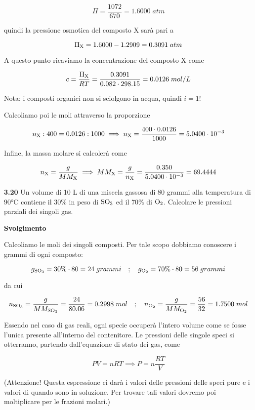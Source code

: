 $$\Pi=\frac{1072}{670}=1.6000\;atm$$

quindi la pressione osmotica del composto X sarà pari a

$$\Pi_{\rm X}=1.6000 - 1.2909 = 0.3091\;atm$$

A questo punto ricaviamo la concentrazione del composto X come

$$c=\frac{\Pi_{\rm X}}{RT}=\frac{0.3091}{0.082 \cdot 298.15}
=0.0126\;mol/L$$

Nota: i composti organici non si sciolgono in acqua, quindi $i=1$!

Calcoliamo poi le moli attraverso la proporzione

$$n_{\rm X}:400=0.0126:1000
\implies
n_{\rm X}=\frac{400 \cdot 0.0126}{1000}
=5.0400 \cdot 10^{-3}$$

Infine, la massa molare si calcolerà come

$$n_{\rm X}=\frac{g}{MM_{\rm X}}
\implies
MM_{\rm X}=\frac{g}{n_{\rm X}}=\frac{0.350}{5.0400 \cdot 10^{-3}}=69.4444$$

\vspace{0.2cm}\textbf{3.20} Un volume di 10 L di una miscela gassosa di 80 grammi alla temperatura di 90°C contiene il
30\% in peso di $\rm SO_3$ ed il 70\% di $\rm O_2$. Calcolare le pressioni parziali dei singoli gas.

\vspace{0.2cm}\large\textbf{Svolgimento}\normalsize

\vspace{0.2cm}Calcoliamo le moli dei singoli composti. Per tale scopo dobbiamo conoscere i grammi di ogni composto:

$$g_{\rm SO_3}=30\% \cdot 80=24\;grammi
\quad;\quad
g_{\rm O_2}=70\% \cdot 80=56\;grammi$$

da cui

\vspace{-0.2cm}$$n_{\rm SO_3}=\frac{g}{MM_{\rm SO_3}}=\frac{24}{80.06}=0.2998\;mol
\quad;\quad
n_{\rm O_2}=\frac{g}{MM_{\rm O_2}}=\frac{56}{32}=1.7500\;mol$$

Essendo nel caso di gas reali, ogni specie occuperà l'intero volume come se fosse l'unica presente all'interno del contenitore. Le pressioni delle singole speci si otterranno, partendo dall'equazione di stato dei gas, come

$$PV=nRT \implies
P=n\frac{RT}{V}$$

(Attenzione! Questa espressione ci darà i valori delle pressioni delle speci pure e i valori di quando sono in soluzione. Per trovare tali valori dovremo poi moltiplicare per le frazioni molari.)

